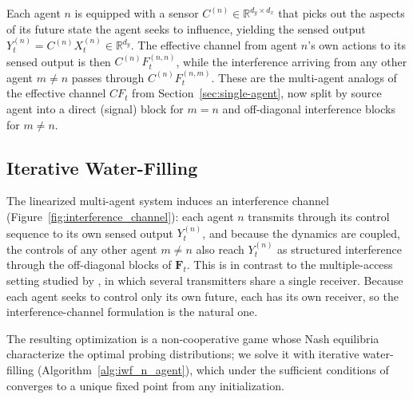 \documentclass{article} %
\begin{document}
Each agent $n$ is equipped with a sensor $C^{(n)} \in \mathbb{R}^{d_y \times d_x}$ that picks out the aspects of its future state the agent seeks to influence, yielding the sensed output $Y_t^{(n)} = C^{(n)} X_t^{(n)} \in \mathbb{R}^{d_y}$. The effective channel from agent $n$'s own actions to its sensed output is then $C^{(n)} F_t^{(n,n)}$, while the interference arriving from any other agent $m \neq n$ passes through $C^{(n)} F_t^{(n,m)}$. These are the multi-agent analogs of the effective channel $CF_t$ from Section~\ref{sec:single-agent}, now split by source agent into a direct (signal) block for $m=n$ and off-diagonal interference blocks for $m \neq n$.


\subsection{Iterative Water-Filling}

The linearized multi-agent system induces an interference channel \citep{carleial_1978} (Figure~\ref{fig:interference_channel}): each agent $n$ transmits through its control sequence to its own sensed output $Y_t^{(n)}$, and because the dynamics are coupled, the controls of any other agent $m \neq n$ also reach $Y_t^{(n)}$ as structured interference through the off-diagonal blocks of $\mathbf{F}_t$. This is in contrast to the multiple-access setting studied by \citet{yu_2004}, in which several transmitters share a single receiver. Because each agent seeks to control only its own future, each has its own receiver, so the interference-channel formulation is the natural one.

The resulting optimization is a non-cooperative game whose Nash equilibria characterize the optimal probing distributions; we solve it with iterative water-filling \citep{yu_2004} (Algorithm~\ref{alg:iwf_n_agent}), which under the sufficient conditions of \cite{wang2025convergenceiterativewaterfillingmultiuser} converges to a unique fixed point from any initialization.
\end{document}
